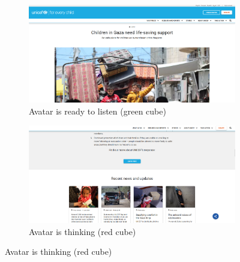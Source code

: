 \begin{figure}[h]
    \centering
	\begin{subfigure}[b]{0.40\textwidth}
        \centering
        \includegraphics[width=\textwidth]{img/critical_heuristics/N8.1a.png}
        \caption{Avatar is ready to listen (green cube)}
        \label{fig:greenlight}
    \end{subfigure}
    \hfill
    \begin{subfigure}[b]{0.40\textwidth}
        \centering
        \includegraphics[width=\textwidth]{img/critical_heuristics/N8.1b.png}
        \caption{Avatar is thinking (red cube)}
        \label{fig:redlight}
    \end{subfigure}
\end{figure}

